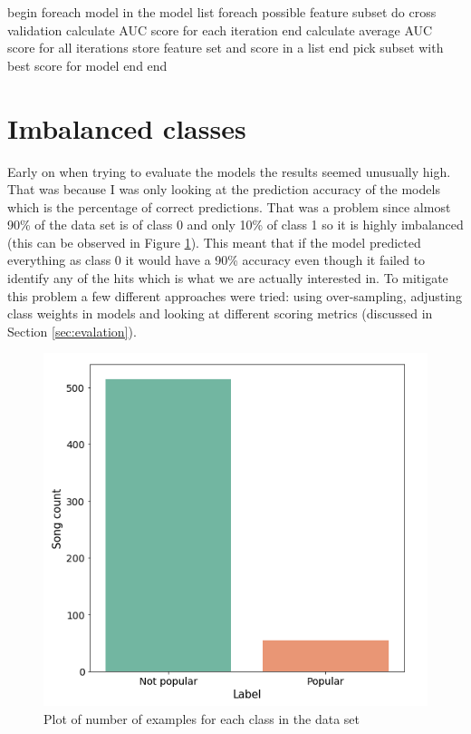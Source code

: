 \begin{algorithm}[caption={"Feature selection algorithm"}, label={alg3}]
begin
    foreach model in the model list
      foreach possible feature subset
        do cross validation
          calculate AUC score for each iteration
        end
        calculate average AUC score for all iterations
        store feature set and score in a list
      end
      pick subset with best score for model
    end
end
    
\end{algorithm}

\section{Imbalanced classes}
\label{sec:imbalance}
Early on when trying to evaluate the models the results seemed unusually high. That was because I was only looking at the prediction accuracy of the models which is the percentage of correct predictions. That was a problem since almost 90\% of the data set is of class 0 and only 10\% of class 1 so it is highly imbalanced (this can be observed in Figure \ref{fig:imbalance}). This meant that if the model predicted everything as class 0 it would have a 90\% accuracy even though it failed to identify any of the hits which is what we are actually interested in. To mitigate this problem a few different approaches were tried: using over-sampling, adjusting class weights in models and looking at different scoring metrics (discussed in Section \ref{sec:evalation}).

\begin{figure}[h]
\centering
\includegraphics[width=0.7\linewidth]{background/fig/imbalance.PNG}
\caption{Plot of number of examples for each class in the data set}
\label{fig:imbalance}
\end{figure}

